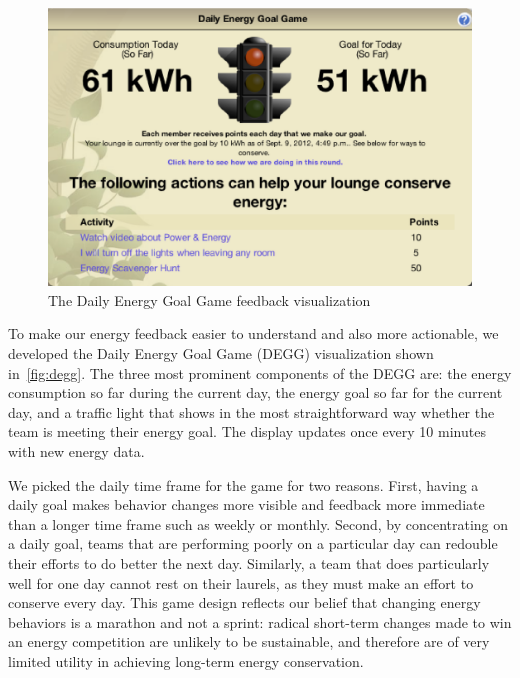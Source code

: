 \documentclass[10pt, conference, compsocconf]{IEEEtran-old}
\begin{document}
\begin{figure}[!tb]
	\centering
	\includegraphics[width=\columnwidth]{degg.eps}
	\caption{The Daily Energy Goal Game feedback visualization}
	\label{fig:degg}
\end{figure}

To make our energy feedback easier to understand and also more actionable, we developed the Daily Energy Goal Game (DEGG) visualization shown in~\autoref{fig:degg}. The three most prominent components of the DEGG are: the energy consumption so far during the current day, the energy goal so far for the current day, and a traffic light that shows in the most straightforward way whether the team is meeting their energy goal. The display updates once every 10 minutes with new energy data.

We picked the daily time frame for the game for two reasons. First, having a daily goal makes behavior changes more visible and feedback more immediate than a longer time frame such as weekly or monthly. Second, by concentrating on a daily goal, teams that are performing poorly on a particular day can redouble their efforts to do better the next day. Similarly, a team that does particularly well for one day cannot rest on their laurels, as they must make an effort to conserve every day. This game design reflects our belief that changing energy behaviors is a marathon and not a sprint: radical short-term changes made to win an energy competition are unlikely to be sustainable, and therefore are of very limited utility in achieving long-term energy conservation.
\end{document}
